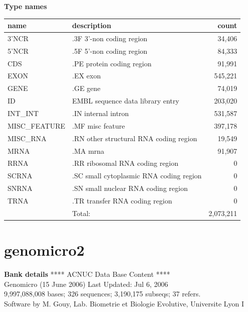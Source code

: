 \documentclass{article}
\begin{document}
\begin{Schunk}
\textbf{Type names}
\noindent\begin{tabular}{llr}
\hline \hline
name & description & count \\
\hline
3'NCR  &  .3F  3'-non coding region  &  34,406 \\
5'NCR  &  .5F  5'-non coding region  &  84,333 \\
CDS  &  .PE protein coding region  &  91,991 \\
EXON  &  .EX exon  &  545,221 \\
GENE  &  .GE gene  &  74,019 \\
ID  &  EMBL sequence data library entry  &  203,020 \\
INT\_INT  &  .IN  internal intron  &  531,587 \\
MISC\_FEATURE  &  .MF misc feature  &  397,178 \\
MISC\_RNA  &  .RN other structural RNA coding region  &  19,549 \\
MRNA  &  .MA mrna  &  91,907 \\
RRNA  &  .RR ribosomal RNA coding region  &  0 \\
SCRNA  &  .SC small cytoplasmic RNA coding region  &  0 \\
SNRNA  &  .SN small nuclear RNA coding region  &  0 \\
TRNA  &  .TR transfer RNA coding region  &  0 \\
\hline
 & Total: & 2,073,211 \\
\hline \hline
\end{tabular}

\section{ genomicro2 }
\textbf{Bank details}
             ****     ACNUC Data Base Content      ****                         \\
              Genomicro (15 June 2006) Last Updated: Jul  6, 2006\\
9,997,088,008 bases; 326 sequences; 3,190,175 subseqs; 37 refers.\\
Software by M. Gouy, Lab. Biometrie et Biologie Evolutive, Universite Lyon I 


\end{Schunk}
\end{document}

